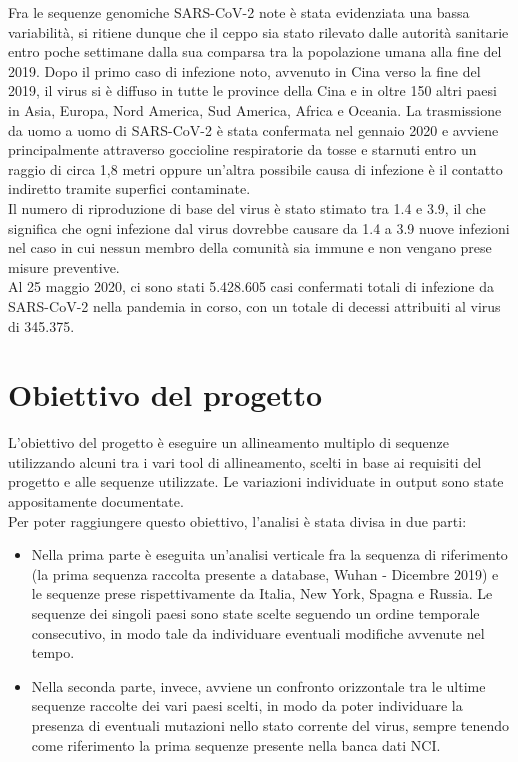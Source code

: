 \documentclass[a4paper,10pt]{article}
\begin{document}
Fra le sequenze genomiche SARS-CoV-2 note è stata evidenziata una bassa variabilità, si ritiene dunque che il ceppo sia stato rilevato dalle autorità sanitarie entro poche settimane dalla sua comparsa tra la popolazione umana alla fine del 2019.
Dopo il primo caso di infezione noto, avvenuto in Cina verso la fine del 2019, il virus si è diffuso in tutte le province della Cina e in oltre 150 altri paesi in Asia, Europa, Nord America, Sud America, Africa e Oceania.
La trasmissione da uomo a uomo di SARS-CoV-2 è stata confermata nel gennaio 2020 e avviene principalmente attraverso goccioline respiratorie da tosse e starnuti entro un raggio di circa 1,8 metri oppure un'altra possibile causa di infezione è il contatto indiretto tramite superfici contaminate.\\
Il numero di riproduzione di base del virus è stato stimato tra 1.4 e 3.9, il che significa che ogni infezione dal virus dovrebbe causare da 1.4 a 3.9 nuove infezioni nel caso in cui nessun membro della comunità sia immune e non vengano prese misure preventive.\\
Al 25 maggio 2020, ci sono stati 5.428.605 casi confermati totali di infezione da SARS-CoV-2 nella pandemia in corso, con un totale di decessi attribuiti al virus di 345.375. 

\newpage

\section{Obiettivo del progetto}
L'obiettivo del progetto è eseguire un allineamento multiplo di sequenze utilizzando alcuni tra i vari tool di allineamento, scelti in base ai requisiti del progetto e alle sequenze utilizzate. Le variazioni individuate in output sono state appositamente documentate. \\
Per poter raggiungere questo obiettivo, l'analisi è stata divisa in due parti:\\ 
\begin{itemize}
\item Nella prima parte è eseguita un'analisi verticale fra la sequenza di riferimento (la prima sequenza raccolta presente a database, Wuhan - Dicembre 2019) e le sequenze prese rispettivamente da Italia, New York, Spagna e Russia. Le sequenze dei singoli paesi sono state scelte seguendo un ordine temporale consecutivo, in modo tale da individuare eventuali modifiche avvenute nel tempo.
\item Nella seconda parte, invece, avviene un confronto orizzontale tra le ultime sequenze raccolte dei vari paesi scelti, in modo da poter individuare la presenza di eventuali mutazioni nello stato corrente del virus, sempre tenendo come riferimento la prima sequenze presente nella banca dati NCI. 
\end{itemize}
\end{document}
